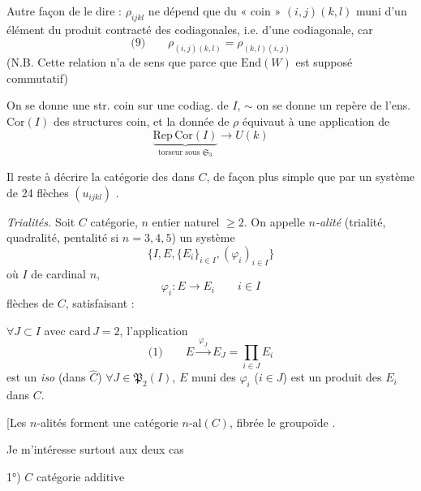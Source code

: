 \documentclass[11pt,a4paper]{article}
\begin{document}
Autre façon de le dire : $\rho_{ijkl}$ ne dépend que du « coin » $(i,j)(k,l)$ muni d'un élément du produit contracté des \struck{\ill{}} codiagonales, i.e. d'une codiagonale, car
\[
\text{(9)}\qquad \rho_{(i,j)(k,l)} = \rho_{(k,l)(i,j)}
\]
(N.B. Cette relation n'a de sens que parce que $\mathrm{End}(W)$ est supposé commutatif)

On se donne une  str. coin sur une codiag. de $I$, $\sim$ on se donne un repère de l'ens. $\mathrm{Cor}(I)$ des structures coin, et la donnée de $\rho$ équivaut à une application de
\[
\underbrace{\mathrm{Rep}\,\mathrm{Cor}(I)}_{\text{torseur sous }\mathfrak S_3} \longrightarrow U(k)
\]

Il reste à décrire la catégorie des  dans $C$, \struck{\ill{}} de façon plus simple que par un système de 24 flèches $(u_{ijkl})$  .

\emph{Trialités.} Soit $C$ catégorie, $n$ entier naturel $\geq 2$. On appelle \emph{$n$-alité} (trialité, quadralité, pentalité si $n=3,4,5$) un système
\[
\{I, E, \{E_i\}_{i\in I}, (\varphi_i)_{i\in I}\}
\]
où $I$  de cardinal $n$,
\[
\varphi_i : E \to E_i \qquad i\in I
\]
flèches de $C$, satisfaisant :

$\forall J\subset I$ avec $\mathrm{card}\,J = 2$, l'application
\[
\text{(1)}\qquad E \xrightarrow{\ \varphi_J\ } E_J = \prod_{i\in J} E_i
\]
est un \emph{iso} (dans $\widehat C$) $\forall J\in\mathfrak P_2(I)$, $E$ muni des $\varphi_i$ ($i\in J$) est un produit des $E_i$ dans $C$.

[Les $n$-alités forment une catégorie $n\text{-al}(C)$, fibrée  \struck{\ill{}} le groupoïde .

Je m'intéresse surtout aux deux cas

1°) $C$ catégorie additive
\end{document}
